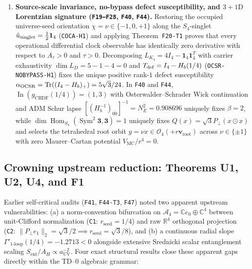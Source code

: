 \documentclass[11pt,a4paper]{article}
\theoremstyle{remark}
\begin{document}
\begin{enumerate}
natural-gradient mobility (\texttt{IGM-H1}), while nonlinear $S_3$ continuation
(\texttt{F17-T1}) bounds the simultaneous equilibrium branch to
$\varepsilon\in(-0.02027043,+0.02905216)$ with zero coercive stable equilibria at
$\varepsilon=1$.
\item \textbf{Source-scale invariance, no-bypass defect susceptibility, and $3+1\mathrm{D}$ Lorentzian signature (\texttt{F19--F28}, \texttt{F40}, \texttt{F44}).}
Restoring the occupied universe-seed orientation $\chi=\nu\in\{-1,0,+1\}$ along
the $S_4$-singlet $\hat{u}_{\rm singlet}=\frac{1}{2}\mathbf{1}_4$ (\texttt{COCA-H1})
and applying Theorem~\texttt{F20-T1} proves that every operational differential
clock observable has identically zero derivative with respect to $A_\tau>0$ and
$\tau>0$. Decomposing $L_{K_4}=4I_4-\mathbf{1}_4\mathbf{1}_4^T$ with carrier
exhaustivity $\dim L_D=5-1-4=0$ and $T_{\rm def}=I_4-H_b(1/4)$
(\texttt{OCSR-NOBYPASS-H1}) fixes the unique positive rank-$1$ defect
susceptibility $\alpha_{\rm OCSR}=\operatorname{Tr}((I_4-H_b)_+)=5\sqrt{3}/24$.
In \texttt{F40} and \texttt{F44}, $\operatorname{In}(g_{\mathrm{CHDF}}(1/4))=(1,3)$
with Osterwalder--Schrader Wick continuation and ADM Schur lapse
$[(H_b^{-1})_{00}]^{-1}=N_E^2=0.908696$ uniquely fixes $\beta=2$, while
$\dim\operatorname{Hom}_{S_4}(\operatorname{Sym}^2\mathbf{3},\mathbf{3})=1$
uniquely fixes $Q(x)=\sqrt{3}P_\perp(x\odot x)$ and selects the tetrahedral root
orbit $y=\nu x\in\mathcal{O}_4(+r\mathbf{v}_{\mathrm{root}})$ across $\nu\in\{\pm 1\}$
with zero Maurer--Cartan potential $V_{\mathrm{MC}}/r^4=0$.
\end{enumerate}

\subsection{Crowning upstream reduction: Theorems U1, U2, U4, and F1}
\label{subsec:upstream-u1-u2-u4-f1}

Earlier self-critical audits (\texttt{F41}, \texttt{F44-T3}, \texttt{F47}) noted
two apparent upstream vulnerabilities: (a) a norm-convention bifurcation on
$\mathcal{A}_4=\mathbb{C}e_0\oplus\mathbb{C}^4$ between unit-Clifford
normalization (\texttt{C1}: $r_{\mathrm{seed}}=1/4$) and raw $\mathbb{R}^4$
orthogonal projection (\texttt{C2}: $\|P_\perp e_1\|_2=\sqrt{3}/2\implies
r_{\mathrm{seed}}=\sqrt{3}/8$), and (b) a continuous radial slope
$\Gamma'_{1\text{-loop}}(1/4)=-1.2713<0$ alongside extensive Srednicki scalar
entanglement scaling $S_{\mathrm{ent}}/A_H\propto a_{\mathrm{UV}}^{-2}$. Four
exact structural results close these apparent gaps directly within the TD--0
algebraic grammar:
\end{document}
